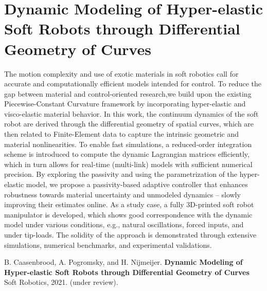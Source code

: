 \graphicspath{{2_Chapter/}}
\chapter{Dynamic Modeling of Hyper-elastic Soft Robots through Differential Geometry of Curves}
\label{chap:2}

\begin{chapter-abstract}
The motion complexity and use of exotic materials in soft robotics call for accurate and computationally efficient models intended for control. To reduce the gap between material and control-oriented research,we build upon the existing Piecewise-Constant Curvature framework by incorporating hyper-elastic and visco-elastic material behavior. In this work, the continuum dynamics of the soft robot are derived through the differential geometry of spatial curves, which are then related to Finite-Element data to capture the intrinsic geometric and material nonlinearities. To enable fast simulations, a reduced-order integration scheme is introduced to compute the dynamic Lagrangian matrices efficiently, which in turn allows for real-time (multi-link) models with sufficient numerical precision. By exploring the passivity and using the parametrization of the hyper-elastic model, we propose a passivity-based adaptive controller that enhances robustness towards material uncertainty and unmodeled dynamics -- slowly improving their estimates online. As a study case, a fully 3D-printed soft robot manipulator is developed, which shows good correspondence with the dynamic model under various conditions, e.g., natural oscillations, forced inputs, and under tip-loads. The solidity of the approach is demonstrated through extensive simulations, numerical benchmarks, and experimental validations.

\end{chapter-abstract}

\vspace{30mm}
\small{
\textrm{
B. Caasenbrood, A. Pogromsky, and H. Nijmeijer. \textbf{Dynamic Modeling of Hyper-elastic Soft Robots through Differential Geometry of Curves} Soft Robotics, 2021. (under review).
}
}

\clearpage
\Materialtrue %
%

%
%
%
%
